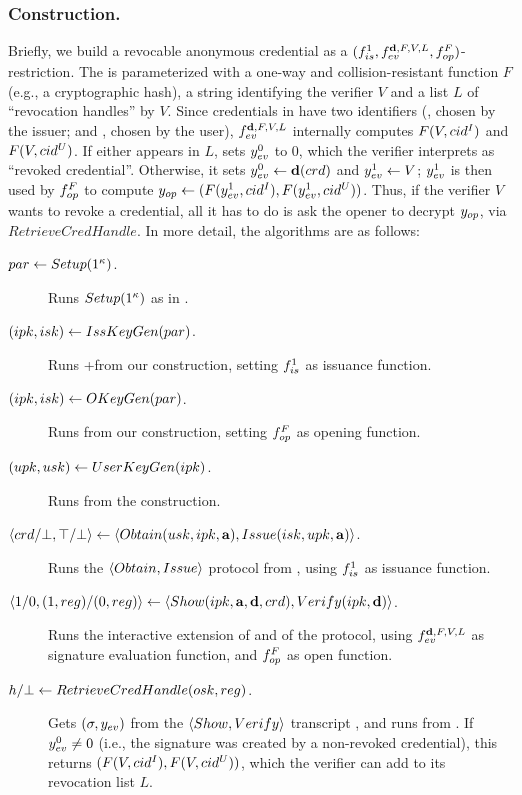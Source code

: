 \subsubsection{\CUASRAC Construction.} %
Briefly, we build a revocable anonymous credential as a $(f_{is}^1,
f_{ev}^{\mathbf{d},F,V,L},f_{op}^{F})$-\CUASGen restriction. The \feval is
parameterized with a one-way and collision-resistant function $F$
(e.g., a cryptographic hash), a string identifying the verifier $V$ and a
list $L$ of ``revocation handles'' by $V$. 
%
Since credentials in \CUASGen have two identifiers (\cidi, chosen by the issuer;
and \cidu, chosen by the user), $f_{ev}^{\mathbf{d},F,V,L}$ internally computes
$F(V,cid^I)$ and $F(V,cid^U)$. If either appears in $L$, \feval sets $y_{ev}^0$
to $0$, which the verifier interprets as ``revoked credential''. Otherwise,
it sets $y_{ev}^0 \gets \mathbf{d}(crd)$ and $y_{ev}^1 \gets V$; $y_{ev}^1$ is
then used by $f_{op}^F$ to compute $y_{op} \gets (F(y_{ev}^1,cid^I),
F(y_{ev}^1,cid^U))$. Thus, if the verifier $V$ wants to revoke a credential, all
it has to do is ask the opener to decrypt $y_{op}$, via $RetrieveCredHandle$.
%
In more detail, the algorithms are as follows:

\begin{description}
\item[$par \gets Setup(1^\kappa)$.] Runs $Setup(1^\kappa)$ as in
  \CUASGen.
\item[$(ipk,isk) \gets IssKeyGen(par)$.] Runs \KeyGen+\ISet from our
  \CUASGen construction, setting $f_{is}^1$ as issuance function.
\item[$(ipk,isk) \gets OKeyGen(par)$.] Runs \OKeyGen from our
  \CUASGen construction, setting $f_{op}^F$ as opening function.
\item[$(upk,usk) \gets UserKeyGen(ipk)$.] Runs \KeyGen from the
  \CUASGen construction.
\item[$\langle crd/\bot,\top/\bot \rangle \gets
  \langle Obtain(usk,ipk,\mathbf{a}),Issue(isk,upk,\mathbf{a}) \rangle$.]
  Runs the $\langle Obtain,Issue \rangle$ protocol from \CUASGen, using
  $f_{is}^1$ as issuance function.
\item[$\langle 1/0,(1,reg)/(0,reg)\rangle \gets \langle Show(ipk,
  \mathbf{a},\mathbf{d},crd),
  Verify(ipk,\mathbf{d}) \rangle$.]
  Runs the interactive extension of \Sign and \Verify of the \CUASGen protocol,
  using $f_{ev}^{\mathbf{d},F,V,L}$ as signature evaluation function, and
  $f_{op}^F$ as open function.
\item[$h/\bot \gets RetrieveCredHandle(osk,reg)$.]
  Gets $(\sigma,y_{ev})$ from the $\langle Show,Verify\rangle$ transcript
  \utrans, and runs \Open from \CUASGen. If $y_{ev}^0 \neq 0$ (i.e., the
  signature was created by a non-revoked credential), this returns $(F(V,cid^I),
  F(V,cid^U))$, which the verifier can add to its revocation list $L$.
\end{description}

